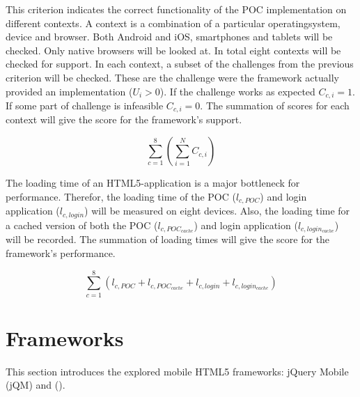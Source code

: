 \documentclass[a4paper]{artikel3}
\newcommand{\setspace}[0]{\vspace{2mm}}
\renewcommand{\paragraph}[1]{\setspace \noindent {\bf #1}  }
\begin{document}
\paragraph{Support}
This criterion indicates the correct functionality of the POC implementation on different contexts.
A context is a combination of a particular operatingsystem, device and browser.
Both Android and iOS, smartphones and tablets will be checked.
Only native browsers will be looked at.
In total eight contexts will be checked for support.
In each context,  a subset of the challenges from the previous criterion will be checked.  
These are the challenge were the framework actually provided an implementation ($U_{i} > 0$).
If the challenge works as expected $C_{c,i} = 1$.
If some part of challenge is infeasible $C_{c,i} = 0$.
The summation of scores for each context will give the score for the framework's support.

\begin{equation}
  \sum_{c=1}^{8}{\left(\sum_{i=1}^{N}C_{c,i}\right)}
  \label{eq:ondersteuning}
\end{equation}

\paragraph{Performance}
The loading time of an HTML5-application is a major bottleneck for performance.
Therefor,  the loading time of the POC ($l_{c,POC}$) and login application ($l_{c,login}$) will be measured on eight devices.
Also,  the loading time for a cached version of both the POC ($l_{c,POC_{cache}}$) and login application ($l_{c,login_{cache}}$) will be recorded.
The summation of loading times will give the score for the framework's performance.

\begin{equation}
  \sum_{c=1}^{8}{\left(l_{c,POC}+l_{c,POC_{cache}}+l_{c,login}+l_{c,login_{cache}}\right)} 
  \label{eq:performantie}
\end{equation}


\section{Frameworks} %
\label{sec:frameworks}
This section introduces the explored mobile HTML5 frameworks: jQuery Mobile (jQM) and \st{} (\sta{}).
\end{document}
